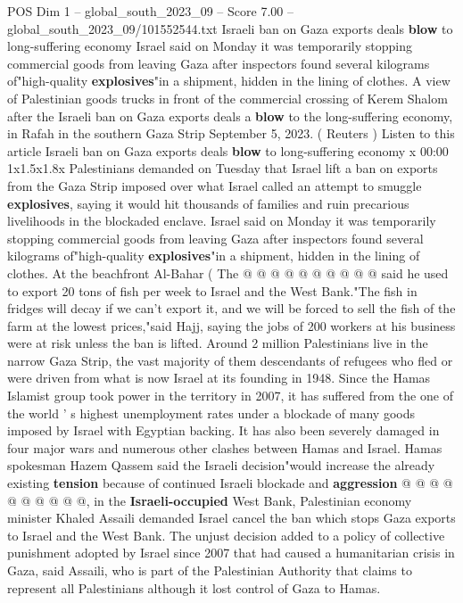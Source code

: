 \begin{textsample}{POS Dim 1 – global\_south\_2023\_09 – Score 7.00 – global\_south\_2023\_09/101552544.txt}  \label{ex:f1_pos_432}
Israeli ban on Gaza exports deals \textbf{blow} to long-suffering economy Israel said on Monday it was temporarily stopping commercial goods from leaving Gaza after inspectors found several kilograms of"high-quality \textbf{explosives}"in a shipment, hidden in the lining of clothes.
A view of Palestinian goods trucks in front of the commercial crossing of Kerem Shalom after the Israeli ban on Gaza exports deals a \textbf{blow} to the long-suffering economy, in Rafah in the southern Gaza Strip September 5, 2023. ( Reuters ) Listen to this article Israeli ban on Gaza exports deals \textbf{blow} to long-suffering economy x 00:00 1x1.5x1.8x Palestinians demanded on Tuesday that Israel lift a ban on exports from the Gaza Strip imposed over what Israel called an attempt to smuggle \textbf{explosives}, saying it would hit thousands of families and ruin precarious livelihoods in the blockaded enclave.
Israel said on Monday it was temporarily stopping commercial goods from leaving Gaza after inspectors found several kilograms of"high-quality \textbf{explosives}"in a shipment, hidden in the lining of clothes.
At the beachfront Al-Bahar ( The @ @ @ @ @ @ @ @ @ @ said he used to export 20 tons of fish per week to Israel and the West Bank."The fish in fridges will decay if we can't export it, and we will be forced to sell the fish of the farm at the lowest prices,"said Hajj, saying the jobs of 200 workers at his business were at risk unless the ban is lifted.
Around 2 million Palestinians live in the narrow Gaza Strip, the vast majority of them descendants of refugees who fled or were driven from what is now Israel at its founding in 1948.
Since the Hamas Islamist group took power in the territory in 2007, it has suffered from the one of the world ' s highest unemployment rates under a blockade of many goods imposed by Israel with Egyptian backing.
It has also been severely damaged in four major wars and numerous other clashes between Hamas and Israel.
Hamas spokesman Hazem Qassem said the Israeli decision"would increase the already existing \textbf{tension} because of continued Israeli blockade and \textbf{aggression} @ @ @ @ @ @ @ @ @ @, in the \textbf{Israeli-occupied} West Bank, Palestinian economy minister Khaled Assaili demanded Israel cancel the ban which stops Gaza exports to Israel and the West Bank.
The unjust decision added to a policy of collective punishment adopted by Israel since 2007 that had caused a humanitarian crisis in Gaza, said Assaili, who is part of the Palestinian Authority that claims to represent all Palestinians although it lost control of Gaza to Hamas.

\end{textsample}
